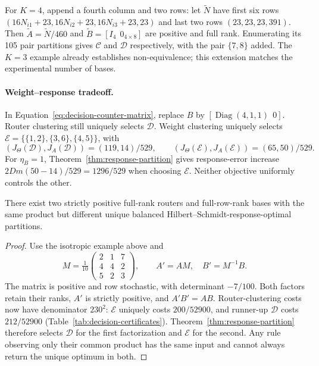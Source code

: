 For $K=4$, append a fourth column and two rows: let $\widetilde N$ have
first six rows $(16N_{i1}+23,16N_{i2}+23,16N_{i3}+23,23)$ and last two
rows $(23,23,23,391)$. Then $\widetilde A=\widetilde N/460$ and
$\widetilde B=[I_4\ \ 0_{4\times8}]$ are positive and full rank.
Enumerating its 105 pair partitions gives $\mathcal C$ and $\mathcal D$
respectively, with the pair $\{7,8\}$ added. The $K=3$ example already
establishes non-equivalence; this extension matches the experimental
number of bases.

\paragraph{Weight--response tradeoff.}
In Equation~\eqref{eq:decision-counter-matrix}, replace $B$ by
$[\operatorname{Diag}(4,1,1)\ \ 0]$. Router clustering still uniquely
selects $\mathcal D$. Weight clustering uniquely selects
$\mathcal E=\{\{1,2\},\{3,6\},\{4,5\}\}$, with
\[
 (J_\Theta(\mathcal D),J_A(\mathcal D))=(119,14)/529,
 \qquad
 (J_\Theta(\mathcal E),J_A(\mathcal E))=(65,50)/529.
\]
For $\eta_B=1$, Theorem~\ref{thm:response-partition} gives response-error
increase $2Dm(50-14)/529=1296/529$ when choosing $\mathcal E$.
Neither objective uniformly controls the other.

\begin{corollary}
\label{cor:decision-information}
There exist two strictly positive full-rank routers and full-row-rank
bases with the same product but different unique balanced
Hilbert--Schmidt-response-optimal partitions.
\end{corollary}
\begin{proof}
Use the isotropic example above and
\[
 M=\tfrac1{10}\begin{pmatrix}2&1&7\\4&4&2\\5&2&3\end{pmatrix},
 \qquad A'=AM,\quad B'=M^{-1}B.
\]
The matrix is positive and row stochastic, with determinant $-7/100$.
Both factors retain their ranks, $A'$ is strictly positive, and
$A'B'=AB$. Router-clustering costs now have denominator $230^2$:
$\mathcal E$ uniquely costs $200/52900$, and runner-up $\mathcal D$
costs $212/52900$ (Table~\ref{tab:decision-certificates}). Theorem~\ref{thm:response-partition}
therefore selects $\mathcal D$ for the first factorization and
$\mathcal E$ for the second. Any rule observing only their common product
has the same input and cannot always return the unique optimum in both.
\end{proof}


